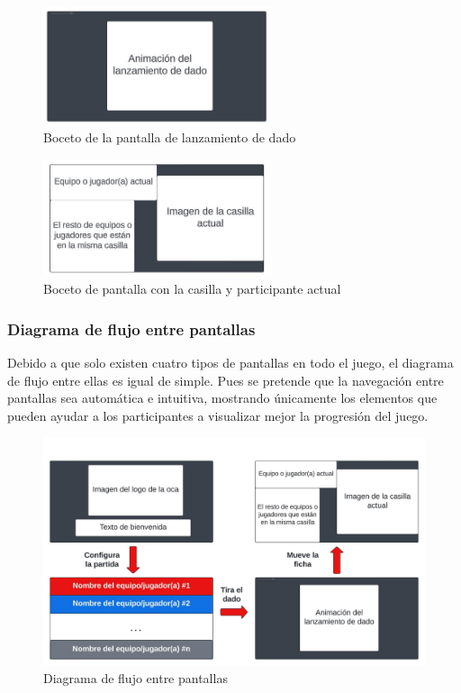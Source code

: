 \begin{figure}[H]
	\centering
	\includegraphics[width=0.6\textwidth]{imgs/boceto-dado.JPG}
	\caption{Boceto de la pantalla de lanzamiento de dado}
	\label{fig:boceto-dado}
\end{figure}

\begin{figure}[H]
	\centering
	\includegraphics[width=0.6\textwidth]{imgs/boceto-casilla.JPG}
	\caption{Boceto de pantalla con la casilla y participante actual}
	\label{fig:boceto-casilla}
\end{figure}

\newpage

\subsubsection{Diagrama de flujo entre pantallas}

Debido a que solo existen cuatro tipos de pantallas en todo el juego, el diagrama de flujo entre ellas es igual de simple. Pues se pretende que la navegación entre pantallas sea automática e intuitiva, mostrando únicamente los elementos que pueden ayudar a los participantes a visualizar mejor la progresión del juego.

\begin{figure}[H]
	\centering
	\includegraphics[width=1\textwidth]{imgs/diagrama-pantallas.jpeg}
	\caption{Diagrama de flujo entre pantallas}
	\label{fig:diagrama-pantallas}
\end{figure}

